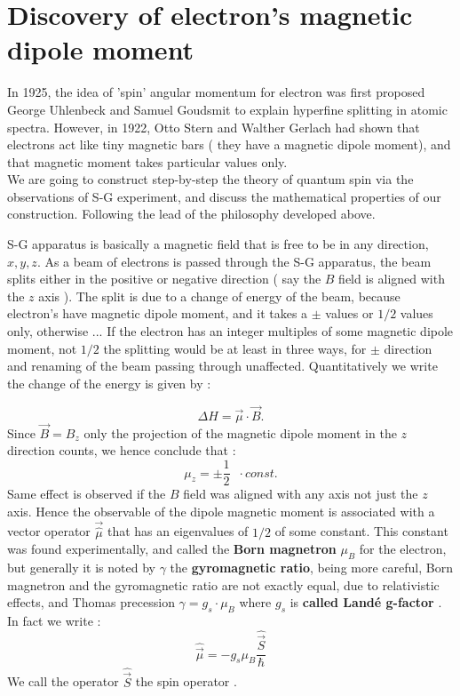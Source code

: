 \section{Discovery of electron's magnetic  dipole moment}
In 1925, the idea of 'spin' angular momentum for electron was first proposed  George Uhlenbeck and Samuel Goudsmit to explain hyperfine splitting in atomic spectra. However, in 1922,  Otto Stern and Walther Gerlach had shown that electrons act  like tiny magnetic bars ( they have a magnetic dipole moment), and that magnetic moment takes particular values only.\\ We are going to construct step-by-step the theory of quantum spin via the observations of S-G experiment, and discuss the mathematical properties of our construction. Following the lead of the philosophy developed above. \\
\par 
S-G apparatus is basically a magnetic field that is free to be in any direction, $x,y,z$. As a beam of electrons is passed through the S-G apparatus, the beam splits either in the positive or negative direction ( say the $B$ field is aligned with the  $z$ axis ). The split is due to a change of energy of the beam, because electron's have magnetic dipole moment, and it takes a $\pm$ values or $ 1/2$ values only, otherwise ... If the electron has an integer multiples of some magnetic dipole moment, not $1/2$ the splitting would be at least in three ways, for $ \pm$ direction  and renaming of the beam passing through unaffected.  Quantitatively we write the change of the energy is given by :

\begin{equation}
\Delta H = \vec \mu \cdot \vec B.
\end{equation}
Since $ \vec B = B_z$ only the  projection of the magnetic dipole moment in the $ z$ direction counts, we hence conclude that :
\begin{equation}
\mu _z  = \pm \frac{1}{2} \; \; \cdot const.
\end{equation}
Same effect is observed if the $B$ field was aligned with any axis not just the $z$ axis. Hence the observable of the dipole magnetic moment is associated with a vector operator  $ \vec  \hat\mu$  that has an eigenvalues of $1/2$ of some constant. This constant was found experimentally, and called the \textbf{Born magnetron} $ \mu_B$ for the electron, but generally it is noted by $ \gamma$ the \textbf{gyromagnetic ratio}, being more careful, Born magnetron and the gyromagnetic ratio are not exactly equal, due to relativistic effects, and Thomas precession $ \gamma = g_s \cdot \mu_B$ where $ g_s$ is \textbf{called Land\'{e} g-factor }. \\ In fact we write :
\begin{equation}
\hat {\vec \mu }= -g_s \mu_B \frac{ \hat {\vec S}}{\hbar}
\end{equation}
We call the operator $ \hat \vec S$ the spin operator .

